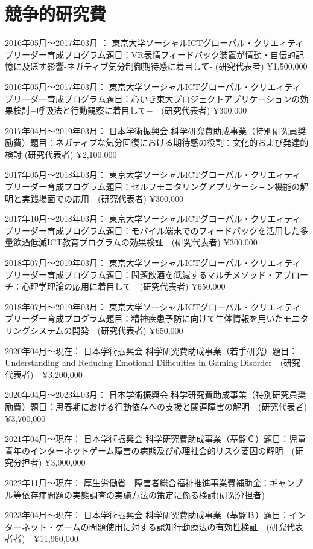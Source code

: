 \documentclass[11pt,a4paper]{article}
\begin{document}
\section{競争的研究費}
\begin{description}
	\item 2016年05月〜2017年03月	： 東京大学ソーシャルICTグローバル・クリエィティブリーダー育成プログラム題目：VR表情フィードバック装置が情動・自伝的記憶に及ぼす影響-ネガティブ気分制御期待感に着目して- (研究代表者) ¥1,500,000
	\item 2016年05月〜2017年03月： 東京大学ソーシャルICTグローバル・クリエィティブリーダー育成プログラム題目：心いき東大プロジェクトアプリケーションの効果検討−呼吸法と行動観察に着目して−　(研究代表者) ¥300,000
	\item 2017年04月〜2019年03月： 日本学術振興会 科学研究費助成事業（特別研究員奨励費）題目：ネガティブな気分回復における期待感の役割：文化的および発達的検討 (研究代表者) ¥2,100,000
	\item 2017年05月〜2018年03月： 東京大学ソーシャルICTグローバル・クリエィティブリーダー育成プログラム題目：セルフモニタリングアプリケーション機能の解明と実践場面での応用　(研究代表者) ¥300,000
	\item 2017年10月〜2018年03月： 東京大学ソーシャルICTグローバル・クリエィティブリーダー育成プログラム題目：モバイル端末でのフィードバックを活用した多量飲酒低減ICT教育プログラムの効果検証　(研究代表者) ¥300,000
	\item 2018年07月〜2019年03月： 東京大学ソーシャルICTグローバル・クリエィティブリーダー育成プログラム題目：問題飲酒を低減するマルチメソッド・アプローチ：心理学理論の応用に着目して　(研究代表者) ¥650,000
	\item 2018年07月〜2019年03月： 東京大学ソーシャルICTグローバル・クリエィティブリーダー育成プログラム題目：精神疾患予防に向けて生体情報を用いたモニタリングシステムの開発　(研究代表者) ¥650,000
	\item 2020年04月〜現在： 日本学術振興会 科学研究費助成事業（若手研究）題目：Understanding and Reducing Emotional Difficulties in Gaming Disorder　(研究代表者)　¥3,200,000
	\item 2020年04月〜2023年03月： 日本学術振興会 科学研究費助成事業（特別研究員奨励費）題目：思春期における行動依存への支援と関連障害の解明　(研究代表者) ¥3,700,000
	\item 2021年04月〜現在： 日本学術振興会 科学研究費助成事業（基盤Ｃ）題目：児童青年のインターネットゲーム障害の病態及び心理社会的リスク要因の解明　(研究分担者) ¥3,900,000
	\item 2022年11月〜現在： 厚生労働省　障害者総合福祉推進事業費補助金：ギャンブル等依存症問題の実態調査の実施方法の策定に係る検討(研究分担者)
	\item 2023年04月〜現在： 日本学術振興会 科学研究費助成事業（基盤Ｂ）題目：インターネット・ゲームの問題使用に対する認知行動療法の有効性検証　(研究代表者者)　¥11,960,000
\end{description}
\end{document}
